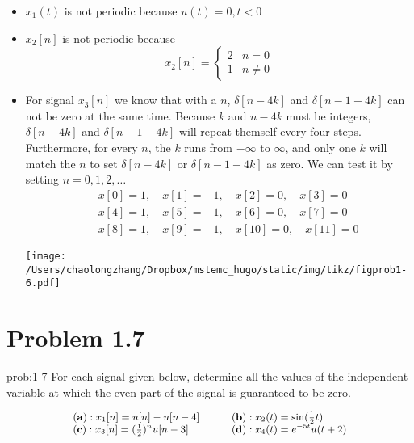 \documentclass[koma,a4paper,utopia,12pt,listings-color,microtype,paralist,colorlinks,urlcolor=red]{org-article}
\begin{document}
\begin{itemize}
\item \(x_{1}(t)\) is not periodic because \(u(t) = 0, t<0\)
\item \(x_{2}[n]\) is not periodic because
\begin{equation*}
x_{2}[n] =
\begin{cases}
2 & n=0 \\
1 & n\neq 0
\end{cases}
\end{equation*}
\item For signal \(x_{3}[n]\) we know that with a \(n\), \(\delta[n-4k]\) and
\(\delta[n-1-4k]\) can not be zero at the same time. Because \(k\) and
\(n-4k\) must be integers, \(\delta[n-4k]\) and \(\delta[n-1-4k]\) will repeat
themself every four steps. Furthermore, for every \(n\), the \(k\) runs from
\(-\infty\) to \(\infty\), and only one \(k\) will match the \(n\) to set
\(\delta[n-4k]\) or \(\delta[n-1-4k]\) as zero. We can test it by setting
\(n = 0,1,2,\ldots\)
\begin{eqnarray*}
&& x[0] = 1,\quad x[1] = -1, \quad x[2] = 0, \quad x[3] = 0 \\
&& x[4] = 1,\quad x[5] = -1, \quad x[6] = 0, \quad x[7] = 0 \\
&& x[8] = 1,\quad x[9] = -1, \quad x[10] = 0, \quad x[11] = 0
\end{eqnarray*}

\begin{center}
\texttt{[image: /Users/chaolongzhang/Dropbox/mstemc\_hugo/static/img/tikz/figprob1-6.pdf]}
\end{center}
\end{itemize}

\section{Problem 1.7}
\label{sec:org292be4b}


\begin{prob}[]{prob:1-7}
For each signal given below, determine all the values of the independent
variable at which the even part of the signal is guaranteed to be zero.

\begin{equation*}
\small
\begin{array}{ll}
 \mathbf{(a)}: x_{1}[n] = u[n] - u[n-4] \qquad  &   \mathbf{(b)}: x_{2}(t) = \sin(\tfrac{1}{2} t) \qquad   \\
  \mathbf{(c)}: x_{3}[n] = (\frac{1}{2})^{n} u[n-3] \qquad &  \mathbf{(d)}: x_{4}(t) = e^{-5t}u(t+2) \\
\end{array}
\end{equation*}
\label{prob:1-7}
\end{prob}
\end{document}
